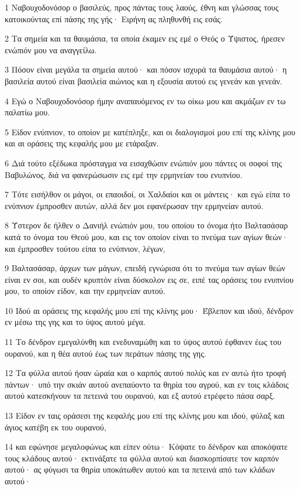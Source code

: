 \par 1 Ναβουχοδονόσορ ο βασιλεύς, προς πάντας τους λαούς, έθνη και γλώσσας τους κατοικούντας επί πάσης της γής· Ειρήνη ας πληθυνθή εις εσάς.
\par 2 Τα σημεία και τα θαυμάσια, τα οποία έκαμεν εις εμέ ο Θεός ο Ύψιστος, ήρεσεν ενώπιόν μου να αναγγείλω.
\par 3 Πόσον είναι μεγάλα τα σημεία αυτού· και πόσον ισχυρά τα θαυμάσια αυτού· η βασιλεία αυτού είναι βασιλεία αιώνιος και η εξουσία αυτού εις γενεάν και γενεάν.
\par 4 Εγώ ο Ναβουχοδονόσορ ήμην αναπαυόμενος εν τω οίκω μου και ακμάζων εν τω παλατίω μου.
\par 5 Είδον ενύπνιον, το οποίον με κατέπληξε, και οι διαλογισμοί μου επί της κλίνης μου και αι οράσεις της κεφαλής μου με ετάραξαν.
\par 6 Διά τούτο εξέδωκα πρόσταγμα να εισαχθώσιν ενώπιόν μου πάντες οι σοφοί της Βαβυλώνος, διά να φανερώσωσιν εις εμέ την ερμηνείαν του ενυπνίου.
\par 7 Τότε εισήλθον οι μάγοι, οι επαοιδοί, οι Χαλδαίοι και οι μάντεις· και εγώ είπα το ενύπνιον έμπροσθεν αυτών, αλλά δεν μοι εφανέρωσαν την ερμηνείαν αυτού.
\par 8 Ύστερον δε ήλθεν ο Δανιήλ ενώπιόν μου, του οποίου το όνομα ήτο Βαλτασάσαρ κατά το όνομα του Θεού μου, και εις τον οποίον είναι το πνεύμα των αγίων θεών· και έμπροσθεν τούτου είπα το ενύπνιον, λέγων,
\par 9 Βαλτασάσαρ, άρχων των μάγων, επειδή εγνώρισα ότι το πνεύμα των αγίων θεών είναι εν σοι, και ουδέν κρυπτόν είναι δύσκολον εις σε, ειπέ τας οράσεις του ενυπνίου μου, το οποίον είδον, και την ερμηνείαν αυτού.
\par 10 Ιδού αι οράσεις της κεφαλής μου επί της κλίνης μου· Έβλεπον και ιδού, δένδρον εν μέσω της γης και το ύψος αυτού μέγα.
\par 11 Το δένδρον εμεγαλύνθη και ενεδυναμώθη και το ύψος αυτού έφθανεν έως του ουρανού, και η θέα αυτού έως των περάτων πάσης της γης.
\par 12 Τα φύλλα αυτού ήσαν ώραία και ο καρπός αυτού πολύς και εν αυτώ ήτο τροφή πάντων· υπό την σκιάν αυτού ανεπαύοντο τα θηρία του αγρού, και εν τοις κλάδοις αυτού κατεσκήνουν τα πετεινά του ουρανού, και εξ αυτού ετρέφετο πάσα σαρξ.
\par 13 Είδον εν ταις οράσεσι της κεφαλής μου επί της κλίνης μου και ιδού, φύλαξ και άγιος κατέβη εκ του ουρανού,
\par 14 και εφώνησε μεγαλοφώνως και είπεν ούτω· Κόψατε το δένδρον και αποκόψατε τους κλάδους αυτού· εκτινάξατε τα φύλλα αυτού και διασκορπίσατε τον καρπόν αυτού· ας φύγωσι τα θηρία υποκάτωθεν αυτού και τα πετεινά από των κλάδων αυτού·
